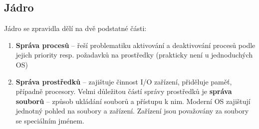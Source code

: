\subsection{Jádro}
Jádro se zpravidla dělí na dvě podstatné části:
\begin{enumerate}
	\item \textbf{Správa procesů} -- řeší problematiku aktivování a deaktivování procesů podle jejich priority resp. požadavků na prostředky (prakticky není u jednoduchých OS)
	\item \textbf{Správa prostředků} -- zajištuje činnost I/O zařízení, přiděluje paměť, případně procesory. Velmi důležitou částí správy prostředků je \textbf{správa souborů} -- způsob ukládání souborů a přístupu k nim. Moderní OS zajištují jednotný pohled na soubory a zařízení. Zařízení jsou považovány za soubory se speciálním jménem.
\end{enumerate}

